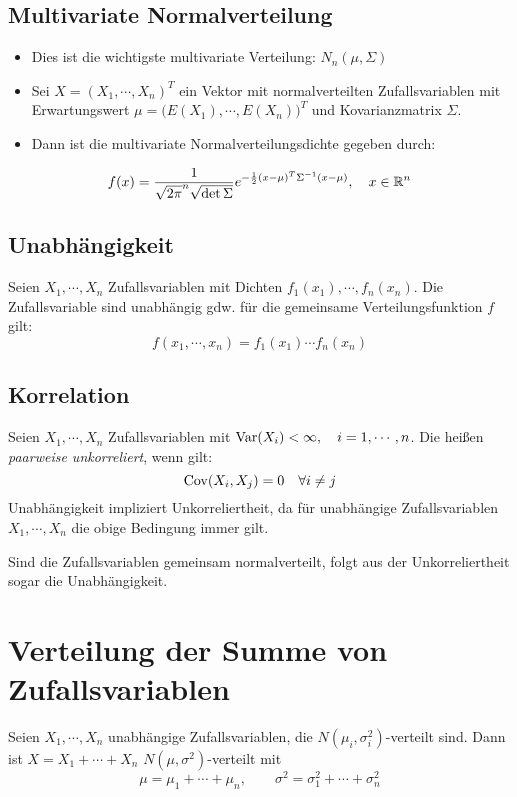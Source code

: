 		\subsection{Multivariate Normalverteilung}
			\begin{itemize}
				\item Dies ist die wichtigste multivariate Verteilung: \( N_n(\mu, \Sigma) \)
				\item Sei \( X = (X_1, \cdots, X_n)^T \) ein Vektor mit normalverteilten Zufallsvariablen mit Erwartungswert \( \mu = \big( E(X_1), \cdots, E(X_n) \big)^T \) und Kovarianzmatrix \(\Sigma\).
				\item Dann ist die multivariate Normalverteilungsdichte gegeben durch:
			\end{itemize}
			\begin{equation*}
				f(x) = \frac{1}{\sqrt{2\pi}^n \sqrt{\det \Sigma}} e ^ { -\frac{1}{2} (x - \mu)^T \Sigma^{-1} (x - \mu) }, \quad x \in \mathbb{R}^n
			\end{equation*}

		\subsection{Unabhängigkeit}
			Seien \( X_1, \cdots, X_n \) Zufallsvariablen mit Dichten \( f_1(x_1), \cdots, f_n(x_n) \). Die Zufallsvariable sind unabhängig gdw. für die gemeinsame Verteilungsfunktion \(f\) gilt:
			\begin{equation*}
				f(x_1, \cdots, x_n) = f_1(x_1) \cdots f_n(x_n)
			\end{equation*}

		\subsection{Korrelation} %
			Seien \( X_1, \cdots, X_n \) Zufallsvariablen mit \( \operatorname{Var}(X_i) < \infty, \quad i = 1, \cdots, n \). Die heißen \textit{paarweise unkorreliert}, wenn gilt:
			\begin{equation*}
				\operatorname{Cov}(X_i, X_j) = 0 \quad \forall i \neq j
			\end{equation*}
			Unabhängigkeit impliziert Unkorreliertheit, da für unabhängige Zufallsvariablen \( X_1, \cdots, X_n \) die obige Bedingung immer gilt.

			Sind die Zufallsvariablen gemeinsam normalverteilt, folgt aus der Unkorreliertheit sogar die Unabhängigkeit.

	\section{Verteilung der Summe von Zufallsvariablen}
		Seien \( X_1, \cdots, X_n \) unabhängige Zufallsvariablen, die \( N(\mu_i, \sigma_i^2) \)-verteilt sind. Dann ist \( X = X_1 + \cdots + X_n \) \( N(\mu, \sigma^2) \)-verteilt mit
		\begin{equation*}
			\mu = \mu_1 + \cdots + \mu_n, \qquad \sigma^2 = \sigma_1^2 + \cdots + \sigma_n^2
		\end{equation*}

